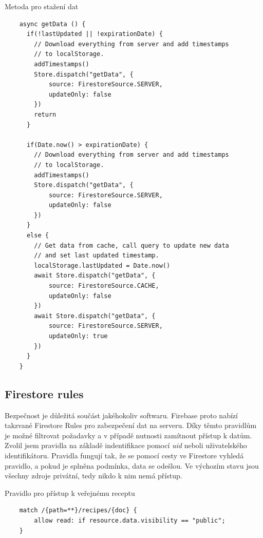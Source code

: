 \begin{listing}[H]
    \caption{Metoda pro stažení dat}
    \begin{verbatim}
    async getData () {
      if(!lastUpdated || !expirationDate) {
        // Download everything from server and add timestamps
        // to localStorage.
        addTimestamps()
        Store.dispatch("getData", {
            source: FirestoreSource.SERVER,
            updateOnly: false
        })
        return
      }

      if(Date.now() > expirationDate) {
        // Download everything from server and add timestamps
        // to localStorage.
        addTimestamps()
        Store.dispatch("getData", {
            source: FirestoreSource.SERVER,
            updateOnly: false
        })
      }
      else {
        // Get data from cache, call query to update new data
        // and set last updated timestamp.
        localStorage.lastUpdated = Date.now()
        await Store.dispatch("getData", {
            source: FirestoreSource.CACHE,
            updateOnly: false
        })
        await Store.dispatch("getData", {
            source: FirestoreSource.SERVER,
            updateOnly: true
        })
      }
    }
    \end{verbatim}
\end{listing}

\newpage

\subsection{Firestore rules}
Bezpečnost je důležitá součást jakéhokoliv softwaru. Firebase proto nabízí takzvané Firestore Rules pro zabezpečení dat na serveru.
Díky těmto pravidlům je možné filtrovat požadavky a v případě nutnosti zamítnout přístup k datům. Zvolil jsem pravidla na základě
indentifikace pomocí \emph{uid} neboli uživatelského identifikátoru. Pravidla fungují tak, že se pomocí cesty ve Firestore vyhledá
pravidlo, a pokud je splněna podmínka, data se odešlou. Ve výchozím stavu jsou všechny zdroje privátní, tedy nikdo k nim nemá přístup.

\begin{listing}[H]
    \caption{Pravidlo pro přístup k veřejnému receptu}
    \begin{verbatim}
    match /{path=**}/recipes/{doc} {
        allow read: if resource.data.visibility == "public";
    }
    \end{verbatim}
\end{listing}


